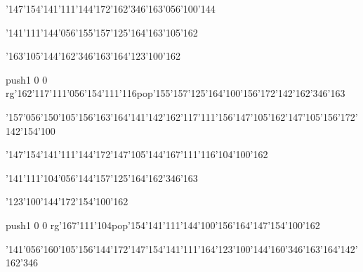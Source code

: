 \null\vfill\ipa\centerline{\enskip\char'147\char'154\char'141\char'111\char'144\char'172\enskip\enskip\enskip\enskip\char'162\char'346\char'163\char'056\char'100\char'144\enskip\enskip\enskip\enskip\enskip\enskip\enskip\enskip\enskip\enskip}\medskip\centerline{\enskip\char'141\char'111\char'144\char'056\char'155\char'157\char'125\char'164\enskip\enskip\enskip\enskip\char'163\char'105\char'162\enskip\enskip\enskip\enskip\enskip\enskip\enskip\enskip\enskip}\medskip\centerline{\enskip\char'163\char'105\char'144\enskip\enskip\enskip\enskip\char'162\char'346\char'163\char'164\enskip\enskip\enskip\char'123\char'100\char'162}\medskip\centerline{\enskip\pdfcolorstack\match push{1 0 0 rg}\char'162\char'117\char'111\char'056\char'154\char'111\char'116\pdfcolorstack\match pop{}\enskip\enskip\enskip\enskip\enskip\char'155\char'157\char'125\char'164\enskip\char'100\char'156\char'172\enskip\char'142\char'162\char'346\char'163}\medskip\centerline{\enskip\char'157\char'056\char'150\char'105\char'156\char'163\char'164\enskip\char'141\enskip\char'142\char'162\char'117\char'111\char'156\enskip\char'147\char'105\char'162\enskip\enskip\enskip\char'147\char'105\char'156\char'172\enskip\char'142\char'154\char'100}\medskip\vfill\footline{\hfil\tt\folio\hfil}\eject
\null\vfill\ipa\centerline{\enskip\char'147\char'154\char'141\char'111\char'144\char'172\enskip\enskip\enskip\enskip\char'147\char'105\char'144\enskip\enskip\enskip\enskip\enskip\enskip\char'167\char'111\char'116\enskip\char'104\char'100\char'162}\medskip\centerline{\enskip\char'141\char'111\char'104\char'056\char'144\char'157\char'125\char'164\enskip\enskip\enskip\enskip\char'162\char'346\char'163\enskip\enskip\enskip\enskip\enskip\enskip\enskip\enskip\enskip}\medskip\centerline{\enskip\enskip\enskip\enskip\enskip\enskip\enskip\enskip\char'123\char'100\char'144\char'172\enskip\enskip\enskip\char'154\char'100\char'162}\medskip\centerline{\enskip\enskip\enskip\enskip\enskip\enskip\enskip\enskip\pdfcolorstack\match push{1 0 0 rg}\char'167\char'111\char'104\pdfcolorstack\match pop{}\enskip\char'154\char'141\char'111\char'144\enskip\char'100\char'156\char'164\enskip\char'147\char'154\char'100\char'162}\medskip\centerline{\enskip\char'141\char'056\char'160\char'105\char'156\char'144\char'172\enskip\enskip\enskip\char'147\char'154\char'141\char'111\char'164\enskip\char'123\char'100\char'144\enskip\enskip\enskip\char'160\char'346\char'163\char'164\enskip\char'142\char'162\char'346}\medskip\vfill\footline{\hfil\tt\folio\hfil}\eject
